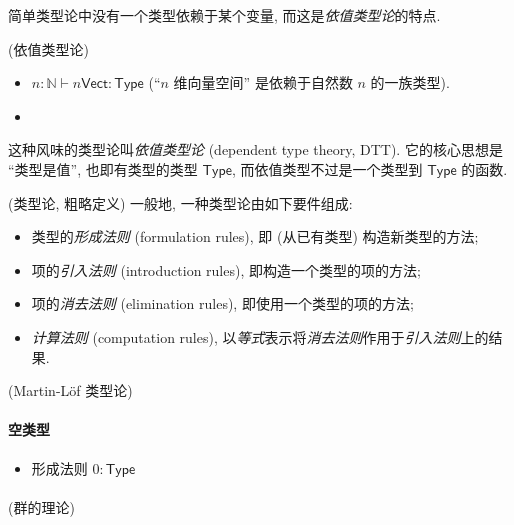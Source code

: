 简单类型论中没有一个类型依赖于某个变量, 而这是\emph{依值类型论}的特点.

\begin{example}
	{(依值类型论)}
	\begin{itemize}
		\item $n\colon \mathbb{N}\vdash n\mathsf {Vect}\colon \mathsf {Type}$ (``$n$ 维向量空间'' 是依赖于自然数 $n$ 的一族类型).
		\item 
	\end{itemize}
	这种风味的类型论叫\emph{依值类型论} (dependent type theory, DTT). 它的核心思想是 ``类型是值'', 也即有类型的类型 $\mathsf {Type}$, 而依值类型不过是一个类型到 $\mathsf {Type}$ 的函数. %
\end{example}

\begin{definition}
	{(类型论, 粗略定义)}
	一般地, 一种类型论由如下要件组成:
	\begin{itemize}
		\item 类型的\emph{形成法则} (formulation rules), 即 (从已有类型) 构造新类型的方法;
		\item 项的\emph{引入法则} (introduction rules), 即构造一个类型的项的方法;
		\item 项的\emph{消去法则} (elimination rules), 即使用一个类型的项的方法;
		\item \emph{计算法则} (computation rules), 以\emph{等式}表示将\emph{消去法则}作用于\emph{引入法则}上的结果.
	\end{itemize}
\end{definition}

\begin{example}
	{(Martin-L\"of 类型论)}
	\paragraph{空类型}
	\begin{itemize}
		\item 形成法则 $0\colon \mathsf {Type}$
	\end{itemize}
	
	\paragraph{}
\end{example}

\begin{example}
	{(群的理论)}
	
\end{example}

